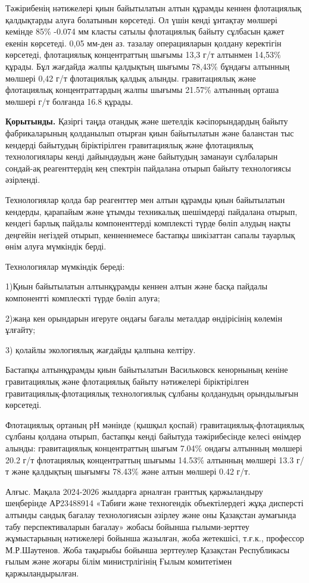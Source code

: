 Тәжірибенің нәтижелері қиын байытылатын алтын құрамды кеннен флотациялық
қалдықтарды алуға болатынын көрсетеді. Ол үшін кенді ұнтақтау мөлшері
кемінде 85\% -0.074 мм класты сатылы флотациялық байыту сұлбасын қажет
екенін көрсетеді. 0,05 мм-ден аз. тазалау операцияларын қолдану
керектігін көрсетеді, флотациялық концентраттың шығымы 13,3 г/т алтынмен
14,53\% құрады. Бұл жағдайда жалпы қалдықтың шығымы 78,43\% бұндағы
алтынның мөлшері 0,42 г/т флотациялық қалдық алынды. гравитациялық және
флотациялық концентраттардың жалпы шығымы 21.57\% алтынның орташа
мөлшері г/т болғанда 16.8 құрады.

{\bfseries Қорытынды.} Қазіргі таңда отандық және шетелдік кәсіпорындардың
байыту фабрикаларының қолданылып отырған қиын байытылатын және баланстан
тыс кендерді байытудың біріктірілген гравитациялық және флотациялық
технологиялары кенді дайындаудың және байытудың заманауи сұлбаларын
сондай-ақ реагенттердің кең спектрін пайдалана отырып байыту
технологиясы әзірленді.

Технологиялар қолда бар реагенттер мен алтын құрамды қиын байытылатын
кендерды, қарапайым және ұтымды техникалық шешімдерді пайдалана отырып,
кендегі барлық пайдалы компоненттерді комплексті түрде бөліп алудың
нақты деңгейін негіздей отырып, кенненнемесе бастапқы шикізаттан сапалы
тауарлық өнім алуға мүмкіндік берді.

Технологиялар мүмкіндік береді:

1)Қиын байытылатын алтынқұрамды кеннен алтын және басқа пайдалы
компонентті комплескті түрде бөліп алуға;

2)жаңа кен орындарын игеруге ондағы бағалы металдар өндірісінің көлемін
ұлғайту;

3) қолайлы экологиялық жағдайды қалпына келтіру.

Бастапқы алтынқұрамды қиын байытылатын Васильковск кенорнының кеніне
гравитациялық және флотациялық байыту нәтижелері біріктірілген
гравитациялық-флотациялық технологиялық сұлбаны қолданудың орындылығын
көрсетеді.

Флотациялық ортаның рН мәнінде (қышқыл қоспай) гравитациялық-флотациялық
сұлбаны қолдана отырып, бастапқы кенді байытуда тәжірибесінде келесі
өнімдер алынды: гравитациялық концентраттың шығым 7.04\% ондағы алтынның
мөлшері 20.2 г/т флотациялық концентраттың шығымы 14.53\% алтынның
мөлшері 13.3 г/т және қалдықтың шығымғы 78.43\% және алтын мөлшері 0.42
г/т.

Алғыс. Мақала 2024-2026 жылдарға арналған гранттық қаржыландыру
шеңберінде АР23488914 «Табиғи және техногендік объектілердегі жұқа
дисперсті алтынды сандық бағалау технологиясын әзірлеу және оны
Қазақстан аумағында табу перспективаларын бағалау» жобасы бойынша
ғылыми-зерттеу жұмыстарының нәтижелері бойынша жазылған, жоба жетекшісі,
т.ғ.к., профессор М.Р.Шаутенов. Жоба тақырыбы бойынша зерттеулер
Қазақстан Республикасы ғылым және жоғары білім министрлігінің Ғылым
комитетімен қаржыландырылған.

